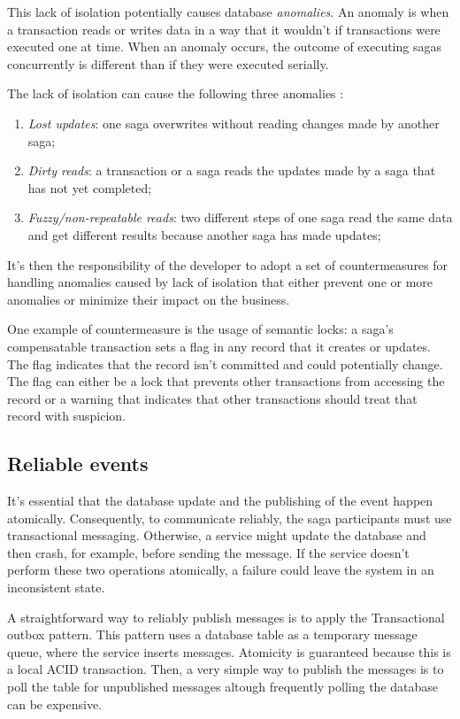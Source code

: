 \documentclass[conference]{IEEEtran}
\begin{document}
This lack of isolation potentially causes database \textit{anomalies}. An anomaly is when a transaction reads or writes data in a way that it wouldn’t if transactions were executed one at time. When an anomaly occurs, the outcome of executing sagas concurrently is different than if they were executed serially.

The lack of isolation can cause the following three anomalies \cite{microservices-patterns-anomalies}:

\begin{enumerate}
  \item \textit{Lost updates}: one saga overwrites without reading changes made by another saga;
  \item \textit{Dirty reads}: a transaction or a saga reads the updates made by a saga that has not yet completed;
  \item \textit{Fuzzy/non-repeatable reads}: two different steps of one saga read the same data and get different results because another saga has made updates;
\end{enumerate}

It’s then the responsibility of the developer to adopt a set of countermeasures for handling anomalies caused by lack of isolation that either prevent one or more anomalies or minimize their impact on the business. \cite{semantic-acid}

One example of countermeasure is the usage of semantic locks: a saga’s compensatable transaction sets a flag in any record that it creates or updates. The flag indicates that the record isn’t committed and could potentially change. The flag can either be a lock that prevents other transactions from accessing the record or a warning that indicates that other transactions should treat that record with suspicion.

\subsection{Reliable events}

It’s essential that the database update and the publishing of the event happen atomically. Consequently, to communicate reliably, the saga participants must use transactional messaging. Otherwise, a service might update the database and then crash, for example, before sending the message. If the service doesn’t perform these two operations atomically, a failure could leave the system in an inconsistent state.

A straightforward way to reliably publish messages is to apply the Transactional outbox pattern. This pattern uses a database table as a temporary message queue, where the service inserts messages. Atomicity is guaranteed because this is a local ACID transaction. Then, a very simple way to publish the messages is to poll the table for unpublished messages altough frequently polling the database can be expensive.
\end{document}
